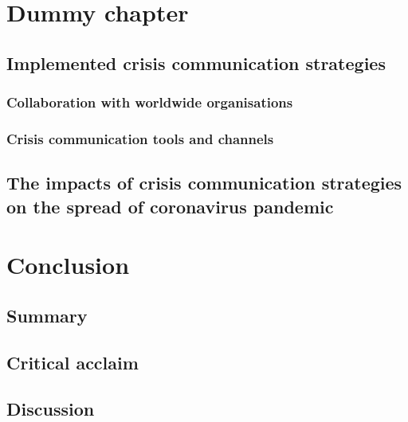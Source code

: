\documentclass[draft=false
              ,paper=a4
              ,twoside=false
              ,fontsize=12pt
              ,headsepline
              ,BCOR10mm
              ,DIV11
              ]{scrbook}
\begin{document}
\vspace{12pt}
\chapter{Dummy chapter}
\vspace{6pt}
\section{Implemented crisis communication strategies}
\vspace{6pt}
\subsection{Collaboration with worldwide organisations}
\vspace{6pt}

\vspace{12pt}
\subsection{Crisis communication tools and channels}
\vspace{6pt}

\vspace{12pt}
\section{The impacts of crisis communication strategies on the spread of coronavirus pandemic}
\vspace{6pt}

\vspace{12pt}
\chapter{Conclusion}
\vspace{6pt}
\section{Summary}
\vspace{6pt}

\vspace{12pt}
\section{Critical acclaim}
\vspace{6pt}

\vspace{12pt}
\section{Discussion}
\vspace{6pt}

\printbibliography[title={V. List of references}]
\printglossary[type=\acronymtype,title={VI. List of Abbreviations}]
\newpage

\end{document}

